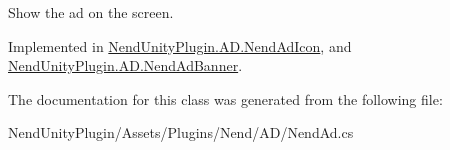 Show the ad on the screen. 



Implemented in \hyperlink{class_nend_unity_plugin_1_1_a_d_1_1_nend_ad_icon_a8e7741b7f1a54cdb75eba5fda4d12540}{Nend\+Unity\+Plugin.\+A\+D.\+Nend\+Ad\+Icon}, and \hyperlink{class_nend_unity_plugin_1_1_a_d_1_1_nend_ad_banner_a5e42a206968be7f5f3c29c1b2b885845}{Nend\+Unity\+Plugin.\+A\+D.\+Nend\+Ad\+Banner}.



The documentation for this class was generated from the following file\+:\begin{DoxyCompactItemize}
\item 
Nend\+Unity\+Plugin/\+Assets/\+Plugins/\+Nend/\+A\+D/Nend\+Ad.\+cs\end{DoxyCompactItemize}
